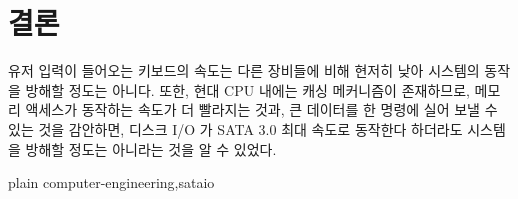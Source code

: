 \documentclass {article}
\begin{document}
\section {결론}
유저 입력이 들어오는 키보드의 속도는 다른 장비들에 비해 현저히 낮아 시스템의 동작을 방해할 정도는 아니다. 또한, 현대 CPU 내에는 캐싱 메커니즘이 존재하므로, 메모리 액세스가 동작하는 속도가 더 빨라지는 것과, 큰 데이터를 한 명령에 실어 보낼 수 있는 것을 감안하면, 디스크 I/O 가 SATA 3.0 최대 속도로 동작한다 하더라도 시스템을 방해할 정도는 아니라는 것을 알 수 있었다.

 {plain}
 {computer-engineering,sataio}
\end{document}
